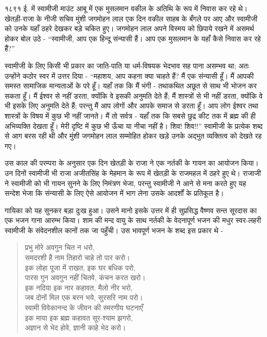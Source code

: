 \delimiter

१८९१ ई. में स्वामीजी माउंट आबू में एक मुसलमान वकील के अतिथि के रूप में निवास कर रहे थे। खेतड़ी-राजा के नीजी सचिव मुंशी जगमोहन लाल एक दिन वकील साहब के बँगले पर आए और स्वामीजी को उनके यहाँ ठहरे देखकर बड़े चकित हुए। जगमोहन लाल अपने विस्मय को छिपाये रखने में असमर्थ होकर बोल उठे - “स्वामीजी, आप एक हिन्दू संन्यासी हैं। आप एक मुसलमान के यहाँ कैसे निवास कर रहे हैं?” 

स्वामीजी के लिए किसी भी प्रकार का जाति-पाति या धर्म-विषयक भेदभाव सह पाना असम्भव था; अतः उन्होंने कठोर स्वर में उत्तर दिया - “महाशय, आप कहना क्या चाहते हैं? मैं एक संन्यासी हूँ। मैं आपकी समस्त सामाजिक मान्यताओं के परे हूँ। यहाँ तक कि मैं भंगी - तथाकथित अछूत से साथ भी भोजन कर सकता हूँ। मैं ईश्वर से नहीं डरता, क्योंकि वे इसकी अनुमति देते हैं; मैं शास्त्रों से भी नहीं डरता, क्योंकि वे भी इसके लिए अनुमति देते हैं; परन्तु मैं आप लोगों और आपके समाज से डरता हूँ। आप लोग ईश्वर तथा शास्त्रों के विषय में कुछ भी नहीं जानते। मैं तो सर्वत्र - यहाँ तक कि सबसे छुद्र कीट तक में ब्रह्म की ही अभिव्यक्ति देखता हूँ। मेरी दृष्टि में कुछ भी ऊँचा या नीचा नहीं है। शिव! शिव!!” स्वामीजी के प्रत्येक शब्द से आग बरस रही थी और मुंशी जगमोहन लाल सम्मोहित होकर खड़े उनके अद्भुत व्यक्तित्व को देखते रह गए। 

\delimiter

उस काल की परम्परा के अनुसार एक दिन खेतड़ी के राजा ने एक नर्तकी के गायन का आयोजन किया। उन दिनों स्वामीजी भी राजा अजीतसिंह के मेहमान के रूप में खेतड़ी के राजमहल में ठहरे हुए थे। राजाजी ने स्वामीजी को भी गायन सुनने के लिए निमंत्रण भेजा, परन्तु स्वामीजी ने आने से मना करते हुए यह सन्देश भेजा कि संन्यासी के लिए ऐसे आयोजन में भाग लेना उसके आदर्शों के प्रतिकूल है। 

गायिका को यह सुनकर बड़ा दुःख हुआ। उसने मानो इसके उत्तर में ही सुप्रसिद्ध वैष्णव सन्त सूरदास का एक भजन गाना आरम्भ किया। शाम की मन्द वायु के साथ नर्तकी के वेदनापूर्ण भजन की मधुर स्वर-लहरी स्वामीजी के संवेदनशील कानों तक जा पहुँची। उस भावपूर्ण भजन के शब्द इस प्रकार थे -

\begin{verse}
 प्रभु मोरे अवगुन चित न धरो,\\
 समदरशी है नाम तिहारो चाहे तो पार करो।\\
 इक लोहा पूजा में राखत, इक घर बधिक परो,\\
 पारस गुन अवगुन नहीं चितवे, कंचन करत खरो।\\
 इक नदिया इक नार कहावत, मैलो नीर भरो,\\
 जब दोनों मिल एक बरन भये, सुरसरि नाम परो।\\
 स्वामी विवेकानन्द के जीवन की स्मरणीय घटनाएँ\\
 इक माया इक ब्रह्म कहावत सूर-श्याम झगरो,\\
 अज्ञान से भेद होवे, ज्ञानी काहे भेद करो।
\end{verse}

